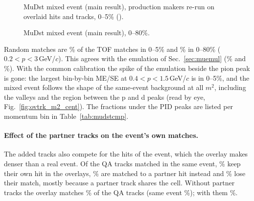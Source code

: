 \begin{figure}[H]
\centering
{}
\caption{MuDst mixed event (main result), production makers re-run on overlaid hits and tracks, 0--5\% ().}
\end{figure}

\begin{figure}[H]
\centering
{}
\caption{MuDst mixed event (main result), 0--80\%.}
\end{figure}

Random matches are \ovtFrCi\% of the TOF matches in 0--5\% and \ovtFrAll\% in 0--80\% ($0.2<p<3$\,GeV/$c$). This agrees with
the emulation of Sec.~\ref{sec:muemul} (\muFrProdCi\% and \muFrProdAll\%). With the common calibration the spike of the
emulation beside the pion peak is gone: the largest bin-by-bin ME/SE at $0.4<p<1.5$\,GeV/$c$ is \ovtVmaxCi{} in 0--5\%, and
the mixed event follows the shape of the same-event background at all $m^2$, including the valleys and the region between
the p and d peaks (read by eye, Fig.~\ref{fig:ovtrk_m2_cent}). The fractions under the PID peaks are listed per momentum bin in
Table~\ref{tab:mudstcmp}.

\paragraph{Effect of the partner tracks on the event's own matches.} The added tracks also compete for the hits of the event,
which the overlay makes denser than a real event. Of the QA tracks matched in the same event, \ovtSEkeep\% keep their own hit
in the overlays, \ovtSEswap\% are matched to a partner hit instead and \ovtSElose\% lose their match, mostly because a
partner track shares the cell. Without partner tracks the overlay matches \ovAnyMatch\% of the QA tracks (same event
\ovSEMatch\%); with them \ovtAnyMatch\%.

